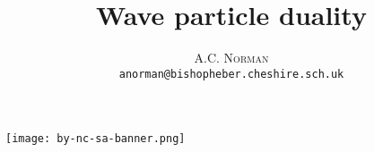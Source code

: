 \documentclass[a4paper,12pt]{article}
\title{Wave particle duality}
\author{\textsc{A.C. Norman}
\\ \texttt{anorman@bishopheber.cheshire.sch.uk}}
\date{}
\begin{document}
\maketitle

\thispagestyle{empty}

%
%
%
%


\vfill

\noindent\texttt{[image: by-nc-sa-banner.png]}
\end{document}
